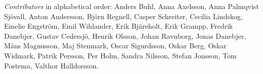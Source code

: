 \emph{Contributors} in alphabetical order:
Anders Buhl,
Anna Axelsson,
Anna Palmqvist Sjövall,
Anton Andersson,
Björn Regnell,
Casper Schreiter,
Cecilia Lindskog,
Emelie Engström,
Emil Wihlander,
Erik Bjäreholt,
Erik Grampp,
Fredrik Danebjer,
Gustav Cedersjö,
Henrik Olsson,
Johan Ravnborg,
Jonas Danebjer, 
Måns Magnusson,
Maj Stenmark,
Oscar Sigurdsson,
Oskar Berg,
Oskar Widmark,
Patrik Persson,
Per Holm,
Sandra Nilsson,
Stefan Jonsson,
Tom Postema,
Valthor Halldorsson. 
